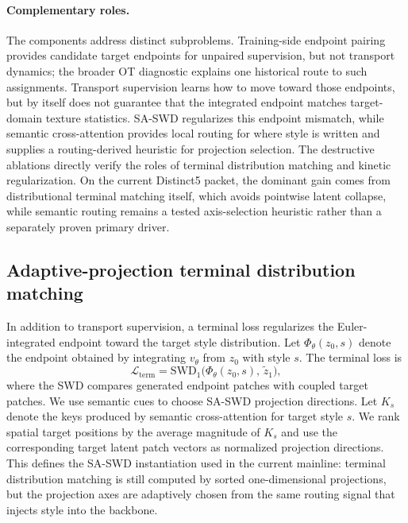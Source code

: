 \documentclass[letterpaper]{article}
\begin{document}
\paragraph{Complementary roles.}
The components address distinct subproblems. Training-side endpoint pairing provides candidate target endpoints for unpaired supervision, but not transport dynamics; the broader OT diagnostic explains one historical route to such assignments. Transport supervision learns how to move toward those endpoints, but by itself does not guarantee that the integrated endpoint matches target-domain texture statistics. SA-SWD regularizes this endpoint mismatch, while semantic cross-attention provides local routing for where style is written and supplies a routing-derived heuristic for projection selection. The destructive ablations directly verify the roles of terminal distribution matching and kinetic regularization. On the current Distinct5 packet, the dominant gain comes from distributional terminal matching itself, which avoids pointwise latent collapse, while semantic routing remains a tested axis-selection heuristic rather than a separately proven primary driver.

\subsection{Adaptive-projection terminal distribution matching}
In addition to transport supervision, a terminal loss regularizes the Euler-integrated endpoint toward the target style distribution. Let $\Phi_\theta(z_0,s)$ denote the endpoint obtained by integrating $v_\theta$ from $z_0$ with style $s$. The terminal loss is
\begin{equation}
    \mathcal{L}_{\mathrm{term}} = \mathrm{SWD}_1\bigl(\Phi_\theta(z_0,s),\,\tilde{z}_1\bigr),
\end{equation}
where the SWD compares generated endpoint patches with coupled target patches. We use semantic cues to choose SA-SWD projection directions. Let $K_s$ denote the keys produced by semantic cross-attention for target style $s$. We rank spatial target positions by the average magnitude of $K_s$ and use the corresponding target latent patch vectors as normalized projection directions. This defines the SA-SWD instantiation used in the current mainline: terminal distribution matching is still computed by sorted one-dimensional projections, but the projection axes are adaptively chosen from the same routing signal that injects style into the backbone.
\end{document}
